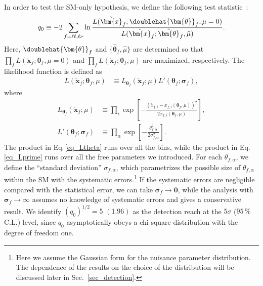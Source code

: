 \documentclass[12pt, a4paper]{article}
\begin{document}
In order to test the SM-only hypothesis, we
define the following test statistic~\cite{Cowan:2010js}:
\begin{align}
  q_0 \equiv -2 \sum_{f=\ell \ell, \ell \nu} \ln \frac
  {L(\check{\bm{x}}_f ; \doublehat{\bm{\theta}}_f, \mu=0)}
  {L(\check{\bm{x}}_f ; \hat{\bm{\theta}}_f, \hat{\mu})}.
  \label{eq_q0}
\end{align}
Here, $\doublehat{\bm{\theta}}_f$ and $\{ \hat{\bm{\theta}}_f, \hat{\mu}
\}$ are determined so that
$\prod_f L(\check{\bm{x}}_f ; \bm{\theta}_f, \mu=0)$ and
$\prod_f L(\check{\bm{x}}_f ; \bm{\theta}_f, \mu)$ are maximized, respectively.
The likelihood function is defined as
\begin{align}
 L(\check{\bm{x}}_f ; \bm{\theta}_f, \mu) &\equiv
 L_{\bm{\theta}_f} (\check{\bm{x}}_f ; \mu) L'(\bm{\theta}_f ; \bm{\sigma}_f),\label{eq_L}
\end{align}
where
\begin{align}
 L_{\bm{\theta}_f} (\check{\bm{x}}_f ; \mu) &\equiv
 \prod_{i} \exp \left[
 -\frac{(\check{x}_{f,i} - \tilde{x}_{f,i} (\bm{\theta}_f, \mu))^2}
 {2 \tilde{x}_{f,i} (\bm{\theta}_f, \mu)}
 \right],\label{eq_Ltheta}\\
 L'(\bm{\theta}_f ; \bm{\sigma}_f) &\equiv
 \prod_{\alpha} \exp \left[
 - \frac{\theta_{f,\alpha}^2}{2\sigma_{f,\alpha}^2}
 \right].\label{eq_Lprime}
\end{align}
The product in Eq.\,\eqref{eq_Ltheta} runs over all the bins, while
the product in Eq.\,\eqref{eq_Lprime} runs over all the free
parameters we introduced.  For each $\theta_{f, \alpha}$, we define
the ``standard deviation'' $\sigma_{f, \alpha}$, which parametrizes
the possible size of $\theta_{f, \alpha}$ within the SM with the
systematic errors.\footnote{
Here we assume the Gaussian form for the nuisance parameter
distribution.  The dependence of the results on the choice of the
distribution will be discussed later in Sec.~\ref{sec_detection}.
}  If the systematic errors are negligible compared
with the statistical error, we can take $\bm{\sigma}_f \to \bm{0}$,
while the analysis with $\bm{\sigma}_f \to \infty$ assumes no
knowledge of systematic errors and gives a conservative result.  We
identify $( q_0 )^{1/2} = 5$ $(1.96)$ as the detection reach at the
$5\sigma$ ($95\,\%$ C.L.) level, since $q_0$ asymptotically obeys a
chi-square distribution with the degree of freedom one.
\end{document}
